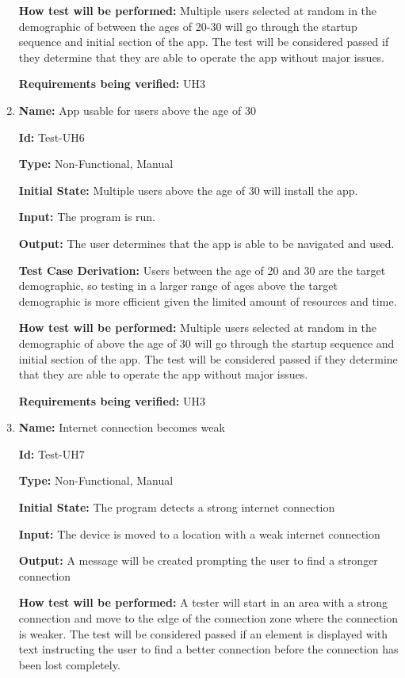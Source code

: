 \documentclass[12pt, titlepage]{article}
\begin{document}
\begin{enumerate}
\textbf{How test will be performed:} Multiple users selected at random in the demographic of between the ages of 20-30 will go through the startup sequence and initial section of the app. The test will be considered passed if they determine that they are able to operate the app without major issues. 

\textbf{Requirements being verified:} UH3

\item{\textbf{Name:} App usable for users above the age of 30}

\textbf{Id:} Test-UH6

\textbf{Type:} Non-Functional, Manual
					
\textbf{Initial State:} Multiple users above the age of 30 will install the app.
					
\textbf{Input:} The program is run.
					
\textbf{Output:} The user determines that the app is able to be navigated and used.

\textbf{Test Case Derivation:} Users between the age of 20 and 30 are the target demographic, so testing in a larger range of ages above the target demographic is more efficient given the limited amount of resources and time.
					
\textbf{How test will be performed:} Multiple users selected at random in the demographic of above the age of 30 will go through the startup sequence and initial section of the app. The test will be considered passed if they determine that they are able to operate the app without major issues. 

\textbf{Requirements being verified:} UH3

\item{\textbf{Name:} Internet connection becomes weak}

\textbf{Id:} Test-UH7

\textbf{Type:} Non-Functional, Manual
					
\textbf{Initial State:} The program detects a strong internet connection
					
\textbf{Input:} The device is moved to a location with a weak internet connection
					
\textbf{Output:} A message will be created prompting the user to find a stronger connection
					
\textbf{How test will be performed:} A tester will start in an area with a strong connection and move to the edge of the connection zone where the connection is weaker. The test will be considered passed if an element is displayed with text instructing the user to find a better connection before the connection has been lost completely.


\end{enumerate}
\end{document}
